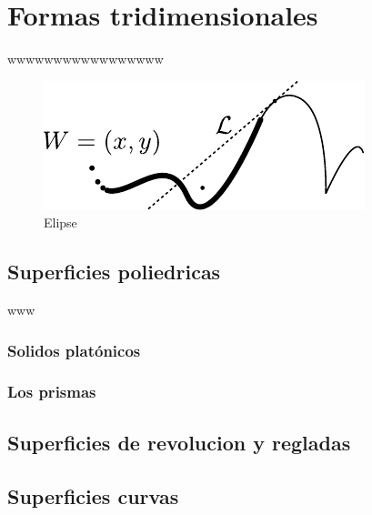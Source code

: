 \documentclass[16pt,]{krantz}
\theoremstyle{definition}
\theoremstyle{definition}
\theoremstyle{definition}
\theoremstyle{definition}
\theoremstyle{remark}
\begin{document}
\hypertarget{formas-tridimensionales}{%
\chapter{Formas tridimensionales}\label{formas-tridimensionales}}

wwwwwwwwwwwwwwwww

\begin{figure}[!ht]

{\centering \includegraphics{puntolinea} 

}

\caption{Elipse}\label{fig:pressure1}
\end{figure}

\hypertarget{superficies-poliedricas}{%
\section{Superficies poliedricas}\label{superficies-poliedricas}}

www

\hypertarget{solidos-platuxf3nicos}{%
\subsection{Solidos platónicos}\label{solidos-platuxf3nicos}}

\hypertarget{los-prismas}{%
\subsection{Los prismas}\label{los-prismas}}

\hypertarget{superficies-de-revolucion-y-regladas}{%
\section{Superficies de revolucion y regladas}\label{superficies-de-revolucion-y-regladas}}

\hypertarget{superficies-curvas}{%
\section{Superficies curvas}\label{superficies-curvas}}
\end{document}
